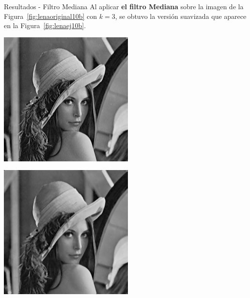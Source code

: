 \documentclass{beamer}
\begin{document}
\begin{frame}[fragile]{Resultados - Filtro Mediana}
	\justifying
	Al aplicar \textcolor{unahurverde}{\textbf{el filtro Mediana}} sobre la imagen de la Figura~\ref{fig:lenaoriginal10b} con $k=3$,  
	se obtuvo la versión suavizada que aparece en la Figura~\ref{fig:lenaej10b}.
	
	\vspace{0.5cm}
	\centering
	\begin{minipage}{0.45\linewidth}
		\centering
		\includegraphics[width=\linewidth]{../results/lena_original}
		\label{fig:lenaoriginal10b}
	\end{minipage}\hfill
	\begin{minipage}{0.45\linewidth}
		\centering
		\includegraphics[width=\linewidth]{../results/lena_ej10b}

\end{minipage}
\end{frame}
\end{document}
